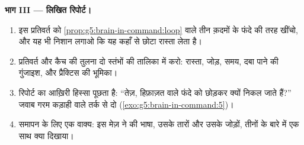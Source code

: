 \begin{problem}[{सप्ताहांत समस्या --- घुटने की उछाल, साज़ों के
साथ}]
\medskip\noindent\textbf{भाग III --- लिखित रिपोर्ट।}
\begin{enumerate}[resume]
  \item इस प्रतिवर्त को \cref{prop:g5:brain-in-command:loop} वाले तीन
        क़दमों के फंदे की तरह खींचो, और यह भी निशान लगाओ कि यह कहाँ से
        छोटा रास्ता लेता है।
  \item प्रतिवर्त और कैच की तुलना दो स्तंभों की तालिका में करो:
        रास्ता, जोड़, समय, दबा पाने की गुंजाइश, और प्रैक्टिस की
        भूमिका।
  \item रिपोर्ट का आख़िरी हिस्सा पूछता है: ``तेज़, हिफ़ाज़त वाले फंदे
         को छोड़कर क्यों निकल जाते हैं?'' जवाब गरम कड़ाही वाले
        तर्क से दो (\cref{exo:g5:brain-in-command:5})।
  \item समापन के लिए एक वाक्य: इस मेज़ ने  की भाषा, उसके
        तारों और उसके जोड़ों, तीनों के बारे में एक साथ क्या दिखाया।
\end{enumerate}
\end{problem}
